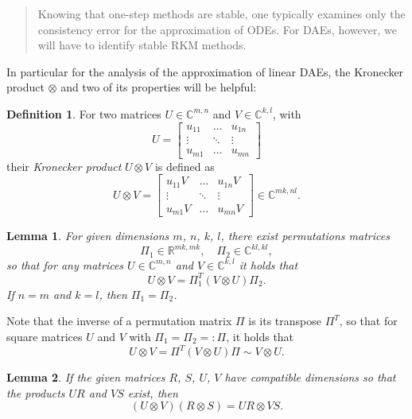 \documentclass[]{book}
\newenvironment {JHSAYS} [0] {\begin{quote}\color{jhsc}} {\end{quote}}
\newtheorem{lemma}{Lemma}[chapter]
\theoremstyle{definition}
\newtheorem{definition}{Definition}[chapter]
\theoremstyle{definition}
\theoremstyle{definition}
\theoremstyle{definition}
\theoremstyle{remark}
\begin{document}
\begin{JHSAYS}
Knowing that one-step methods are stable, one typically examines only the consistency error for the approximation of ODEs. For DAEs, however, we will have to identify stable RKM methods.
\end{JHSAYS}

In particular for the analysis of the approximation of linear DAEs, the Kronecker product \(\otimes\) and two of its properties will be helpful:

\begin{definition}
\protect\hypertarget{def:v-kronecker-product}{}{\label{def:v-kronecker-product} }For two matrices \(U \in \mathbb C^{m,n}\) and \(V\in \mathbb C^{k,l}\), with
\[
U = 
\begin{bmatrix}
u_{11} & \dots & u_{1n} \\
\vdots & \ddots & \vdots \\
u_{m1} & \dots & u_{mn}
\end{bmatrix}
\]
their \emph{Kronecker product} \(U \otimes V\) is defined as
\[
U\otimes V = 
\begin{bmatrix}
u_{11}V & \dots & u_{1n}V \\
\vdots & \ddots & \vdots \\
u_{m1}V & \dots & u_{mn}V
\end{bmatrix}
\in \mathbb C^{mk, nl}.
\]
\end{definition}

\begin{lemma}
\protect\hypertarget{lem:v-kronecker-perfect-shuffle}{}{\label{lem:v-kronecker-perfect-shuffle} }For given dimensions \(m\), \(n\), \(k\), \(l\), there exist permutations matrices
\[
\Pi_1 \in \mathbb R^{mk, mk}, \quad \Pi_2 \in \mathbb C^{kl, kl},
\]
so that for any matrices \(U \in \mathbb C^{m,n}\) and \(V\in \mathbb C^{k,l}\) it holds that
\[
U\otimes V = \Pi_1^T (V\otimes U) \Pi_2.
\]
If \(n=m\) and \(k=l\), then \(\Pi_1=\Pi_2\).
\end{lemma}

Note that the inverse of a permutation matrix \(\Pi\) is its transpose \(\Pi^T\), so that for square matrices \(U\) and \(V\) with \(\Pi_1=\Pi_2=:\Pi\), it holds that
\[
U\otimes V = \Pi^T(V\otimes U)\Pi \sim V\otimes U.
\]

\begin{lemma}
\protect\hypertarget{lem:v-kronecker-associativity}{}{\label{lem:v-kronecker-associativity} }If the given matrices \(R\), \(S\), \(U\), \(V\) have compatible dimensions so that the products \(UR\) and \(VS\) exist, then
\[
(U\otimes V)(R\otimes S) = UR \otimes VS.
\]
\end{lemma}
\end{document}

